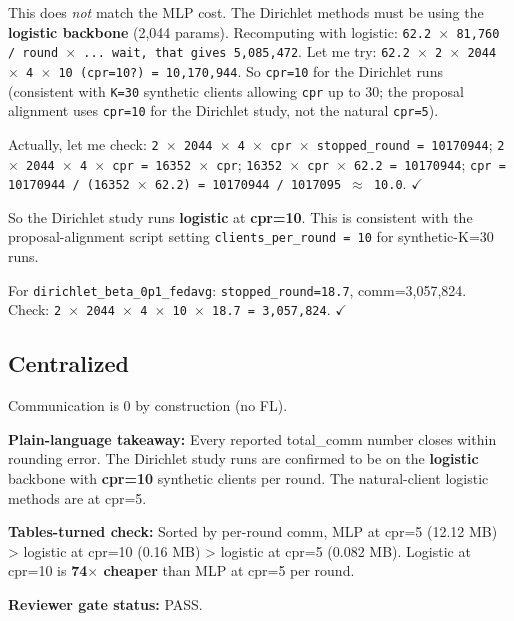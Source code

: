 \documentclass{article}
\begin{document}
This does \emph{not} match the MLP cost. The Dirichlet methods must be using the \textbf{logistic backbone} (2,044 params). Recomputing with logistic: \texttt{62.2 \ensuremath{\times} 81,760 / round \ensuremath{\times} ... wait, that gives 5,085,472}. Let me try: \texttt{62.2 \ensuremath{\times} 2 \ensuremath{\times} 2044 \ensuremath{\times} 4 \ensuremath{\times} 10 (cpr=10?) = 10,170,944}. So \texttt{cpr=10} for the Dirichlet runs (consistent with \texttt{K=30} synthetic clients allowing \texttt{cpr} up to 30; the proposal alignment uses \texttt{cpr=10} for the Dirichlet study, not the natural \texttt{cpr=5}).


Actually, let me check: \texttt{2 \ensuremath{\times} 2044 \ensuremath{\times} 4 \ensuremath{\times} cpr \ensuremath{\times} stopped\_round = 10170944}; \texttt{2 \ensuremath{\times} 2044 \ensuremath{\times} 4 \ensuremath{\times} cpr = 16352 \ensuremath{\times} cpr}; \texttt{16352 \ensuremath{\times} cpr \ensuremath{\times} 62.2 = 10170944}; \texttt{cpr = 10170944 / (16352 \ensuremath{\times} 62.2) = 10170944 / 1017095 \ensuremath{\approx} 10.0}. \ensuremath{\checkmark}


So the Dirichlet study runs \textbf{logistic} at \textbf{cpr=10}. This is consistent with the proposal-alignment script setting \texttt{clients\_per\_round = 10} for synthetic-K=30 runs.


For \texttt{dirichlet\_beta\_0p1\_fedavg}: \texttt{stopped\_round=18.7}, comm=3,057,824. Check: \texttt{2 \ensuremath{\times} 2044 \ensuremath{\times} 4 \ensuremath{\times} 10 \ensuremath{\times} 18.7 = 3,057,824}. \ensuremath{\checkmark}


\subsection{Centralized}


Communication is 0 by construction (no FL).


\textbf{Plain-language takeaway:} Every reported total\_comm number closes within rounding error. The Dirichlet study runs are confirmed to be on the \textbf{logistic} backbone with \textbf{cpr=10} synthetic clients per round. The natural-client logistic methods are at cpr=5.


\textbf{Tables-turned check:} Sorted by per-round comm, MLP at cpr=5 (12.12 MB) > logistic at cpr=10 (0.16 MB) > logistic at cpr=5 (0.082 MB). Logistic at cpr=10 is \textbf{74\ensuremath{\times} cheaper} than MLP at cpr=5 per round.


\textbf{Reviewer gate status:} PASS.
\end{document}
